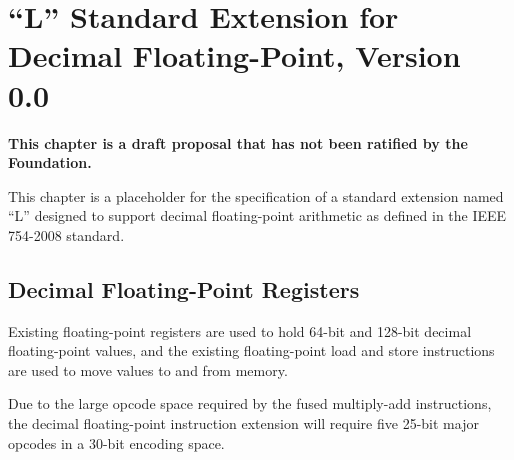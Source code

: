 \chapter{``L'' Standard Extension for Decimal Floating-Point, Version 0.0}

{\bf This chapter is a draft proposal that has not been ratified by
  the Foundation.}

This chapter is a placeholder for the specification of a standard
extension named ``L'' designed to support decimal floating-point
arithmetic as defined in the IEEE 754-2008 standard.

\section{Decimal Floating-Point Registers}

Existing floating-point registers are used to hold 64-bit and 128-bit
decimal floating-point values, and the existing floating-point load
and store instructions are used to move values to and from memory.

\begin{commentary}
Due to the large opcode space required by the fused multiply-add
instructions, the decimal floating-point instruction extension will
require five 25-bit major opcodes in a 30-bit encoding space.
\end{commentary}
